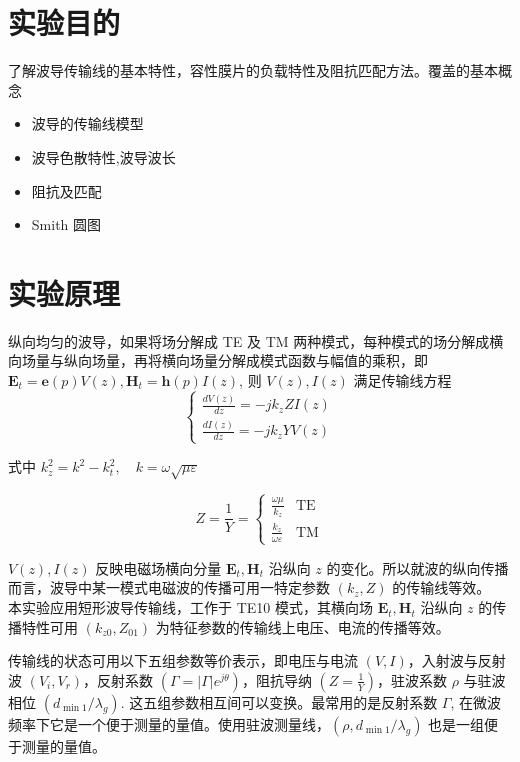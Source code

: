 \documentclass[12pt,a4paper,UTF8]{article}
\begin{document}

\maketoc    %

\section{实验目的}
了解波导传输线的基本特性，容性膜片的负载特性及阻抗匹配方法。覆盖的基本概念
\begin{itemize}
    \item 波导的传输线模型
    \item 波导色散特性,波导波长
    \item 阻抗及匹配
    \item Smith 圆图
\end{itemize}

\section{实验原理}
纵向均匀的波导，如果将场分解成 TE 及 TM 两种模式，每种模式的场分解成横向场量与纵向场量，再将横向场量分解成模式函数与幅值的乘积，即 $\mathbf{E}_t = \mathbf{e}(p)V(z), \mathbf{H}_t = \mathbf{h}(p)I(z)$, 则 $V(z), I(z)$ 满足传输线方程
\begin{equation}
\begin{cases}
\frac{dV(z)}{dz} = -jk_z Z I(z) \\
\frac{dI(z)}{dz} = -jk_z Y V(z)
\end{cases}
\tag{式 4-1}
\end{equation}

式中 $k_z^2 = k^2 - k_t^2, \quad k = \omega \sqrt{\mu \varepsilon}$

\begin{equation}
Z = \frac{1}{Y} = 
\begin{cases}
\frac{\omega \mu}{k_z} & \text{TE} \\
\frac{k_z}{\omega \varepsilon} & \text{TM}
\end{cases}
\tag{式 4-2}
\end{equation}

$V(z), I(z)$ 反映电磁场横向分量 $\mathbf{E}_t, \mathbf{H}_t$ 沿纵向 $z$ 的变化。所以就波的纵向传播而言，波导中某一模式电磁波的传播可用一特定参数 $(k_z, Z)$ 的传输线等效。\\
本实验应用短形波导传输线，工作于 TE10 模式，其横向场 $\mathbf{E}_t, \mathbf{H}_t$ 沿纵向 $z$ 的传播特性可用 $(k_{z0}, Z_{01})$ 为特征参数的传输线上电压、电流的传播等效。

传输线的状态可用以下五组参数等价表示，即电压与电流 $(V, I)$，入射波与反射波 $(V_i, V_r)$，反射系数 $(\Gamma = | \Gamma | e^{j\theta})$，阻抗导纳 $(Z = \frac{1}{Y})$，驻波系数 $\rho$ 与驻波相位 $(d_{\min 1}/\lambda_g)$. 这五组参数相互间可以变换。最常用的是反射系数 $\Gamma$, 在微波频率下它是一个便于测量的量值。使用驻波测量线，$(\rho, d_{\min 1}/\lambda_g)$ 也是一组便于测量的量值。
\end{document}
